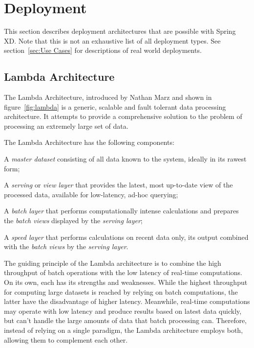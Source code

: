 \section{Deployment}
This section describes deployment architectures that are possible with Spring XD.
Note that this is not an exhaustive list of all deployment types. See
section~\ref{sec:Use Cases} for descriptions of real world deployments.

\subsection{Lambda Architecture}

The Lambda Architecture, introduced by Nathan Marz \cite{lambda-architecture-paper}
and shown in figure~\ref{fig:lambda}
is a generic, scalable and fault tolerant data  processing architecture. It 
attempts to provide a comprehensive solution to the problem of processing an 
extremely large set of data.

The Lambda Architecture has the following components:

\begin{itemize*}
\item A \emph{master dataset} consisting of all data known to the system,
ideally in its rawest form;
\item A \emph{serving} or \emph{view layer} that provides the latest,
most up-to-date view of the processed data, available for low-latency,
ad-hoc querying;
\item A \emph{batch layer} that performs computationally intense 
calculations and prepares the \emph{batch views} displayed by the 
\emph{serving layer};
\item A \emph{speed layer} that performs calculations on recent data only, 
its output combined with the \emph{batch views} by the \emph{serving layer}.
\end{itemize*}

The guiding principle of the Lambda architecture is to combine the
high throughput of batch operations with the low latency of real-time
computations. On its own, each has its strengths and weaknesses. While the
highest throughput for computing large datasets is reached by relying on
batch computations, the latter have the disadvantage of higher latency.
Meanwhile, real-time computations may operate with low latency and produce
results based on latest data quickly, but can't handle the large
amounts of data that batch processing can. Therefore, instead of relying
on a single paradigm, the Lambda architecture employs both, allowing them
to complement each other.

